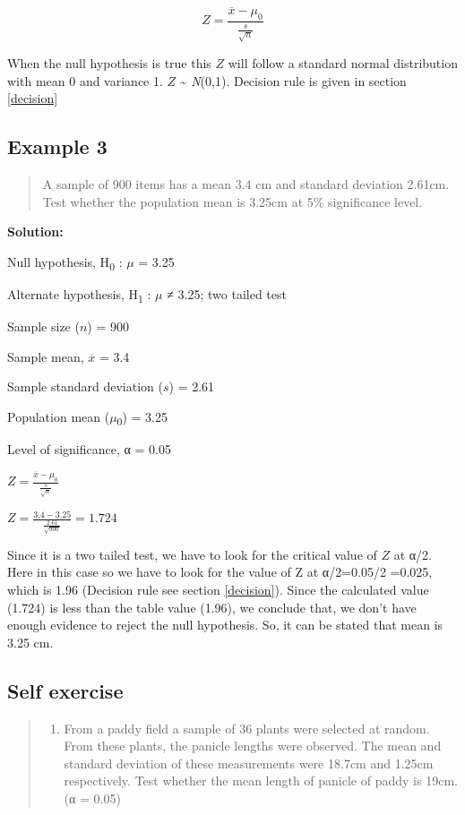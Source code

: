 \documentclass[
]{book}
\providecommand{\tightlist}{%
  \setlength{\itemsep}{0pt}\setlength{\parskip}{0pt}}
\begin{document}
\[Z = \frac{\overline{x} - \mu_{0}}{\frac{s}{\sqrt{n}}}\]

When the null hypothesis is true this \(Z\) will follow a standard normal distribution with mean 0 and variance 1. \(Z\) \textasciitilde{} \emph{N}(0,1). Decision rule is given in section \ref{decision}

\hypertarget{example-3-1}{%
\subsection*{Example 3}\label{example-3-1}}

\begin{quote}
A sample of 900 items has a mean 3.4 cm and standard deviation 2.61cm. Test whether the population mean is 3.25cm at 5\% significance level.
\end{quote}

\textbf{Solution:}

Null hypothesis, H\textsubscript{0} : \(μ\) = 3.25

Alternate hypothesis, H\textsubscript{1} : \(μ\) ≠ 3.25; two tailed test

Sample size (\(n\)) = 900

Sample mean, \(\overline{x}\) = 3.4

Sample standard deviation (\(s\)) = 2.61

Population mean (\(μ\)\textsubscript{0}) = 3.25

Level of significance, α = 0.05

\(Z = \frac{\overline{x} - \mu_{0}}{\frac{s}{\sqrt{n}}}\)

\(Z = \frac{3.4 - 3.25}{\frac{2.61}{\sqrt{900}}} = 1.724\)

Since it is a two tailed test, we have to look for the critical value of \(Z\) at α/2. Here in this case so we have to look for the value of Z at α/2=0.05/2 =0.025, which is 1.96 (Decision rule see section \ref{decision}). Since the
calculated value (1.724) is less than the table value (1.96), we conclude that, we don't have enough evidence to reject the null hypothesis. So, it can be stated that mean is 3.25 cm.

\hypertarget{self-exercise}{%
\subsection*{Self exercise}\label{self-exercise}}

\begin{quote}
\begin{enumerate}
\def\labelenumi{\arabic{enumi}.}
\setcounter{enumi}{1}
\tightlist
\item
  From a paddy field a sample of 36 plants were selected at random. From these plants, the panicle lengths were observed. The mean and standard deviation of these measurements were 18.7cm and 1.25cm respectively. Test whether the mean length of panicle of paddy is 19cm. (α = 0.05)
\end{enumerate}
\end{quote}
\end{document}
